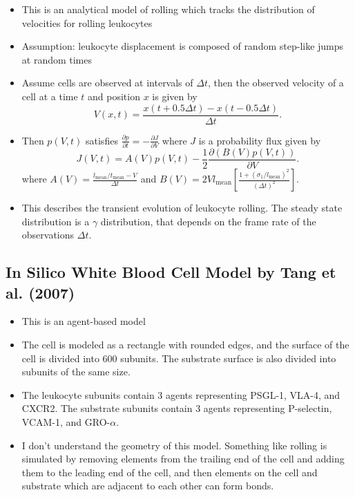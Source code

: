 \documentclass[
10pt, %
letterpaper, %
twocolumn, %
landscape %
]{article}
\begin{document}
\begin{itemize}
\item This is an analytical model of rolling which tracks the
  distribution of velocities for rolling leukocytes
\item Assumption: leukocyte displacement is composed of random
  step-like jumps at random times
\item Assume cells are observed at intervals of $\Delta t$, then the
  observed velocity of a cell at a time $t$ and position $x$ is given
  by
  \begin{equation}
    \label{eq:random_velocity}
    V(x, t) = \frac{x(t + 0.5 \Delta t) - x(t - 0.5 \Delta t)}{\Delta
      t}.
  \end{equation}
\item Then $p(V, t)$ satisfies $\frac{\partial p}{\partial t} =
  -\frac{\partial J}{\partial V}$ where $J$ is a probability flux
  given by
  \begin{equation}
    \label{eq:prob_flux}
    J(V, t) = A(V) p(V, t) - \frac{1}{2}\frac{\partial (B(V) p(V,
      t))}{\partial V}.
  \end{equation}
  where $A(V) = \frac{l_\text{mean}/t_\text{mean} - V}{\Delta t}$ and
  $B(V) = 2V l_\text{mean}\left[\frac{1 +
      (\sigma_1/l_\text{mean})^2}{(\Delta t)^2}\right].$
\item This describes the transient evolution of leukocyte rolling. The
  steady state distribution is a $\gamma$ distribution, that depends
  on the frame rate of the observations $\Delta t$.
\end{itemize}

\subsection{In Silico White Blood Cell Model by Tang et al. (2007)}
\label{sec:silico-white-blood}

\begin{itemize}
\item This is an agent-based model
\item The cell is modeled as a rectangle with rounded edges, and the
  surface of the cell is divided into 600 subunits. The substrate
  surface is also divided into subunits of the same size.
\item The leukocyte subunits contain 3 agents representing PSGL-1,
  VLA-4, and CXCR2. The substrate subunits contain 3 agents
  representing P-selectin, VCAM-1, and GRO-$\alpha$.
\item I don't understand the geometry of this model. Something like
  rolling is simulated by removing elements from the trailing end of
  the cell and adding them to the leading end of the cell, and then
  elements on the cell and substrate which are adjacent to each other
  can form bonds.
\end{itemize}
\end{document}
